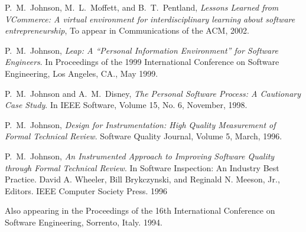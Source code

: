 \begin{Publications: Other Significant}

\item P.~M.~Johnson, M.~L.~Moffett, and B.~T.~Pentland, {\em Lessons
Learned from VCommerce: A virtual environment for interdisciplinary
learning about software entrepreneurship}, To appear in Communications of
the ACM, 2002.

\item P.~M.~Johnson, {\em Leap: A ``Personal Information Environment'' for
Software Engineers}. In
  Proceedings of the 1999 International Conference on Software Engineering,
  Los Angeles, CA., May 1999.
  
  
\item P.~M.~Johnson and A.~M.~Disney, {\em The Personal Software Process: A
    Cautionary Case Study}.  In IEEE Software, Volume 15, No. 6, November,
  1998.

\item P.~M.~Johnson, {\em Design for Instrumentation: High Quality
    Measurement of Formal Technical Review}.  Software Quality Journal,
  Volume 5, March, 1996.

\item P.~M.~Johnson, {\em An Instrumented Approach to Improving Software
  Quality through Formal Technical Review}. In Software Inspection: 
  An Industry Best Practice.  David A. Wheeler, Bill Brykczynski, and
  Reginald N. Meeson, Jr., Editors.  IEEE Computer Society Press. 1996

  Also appearing in the Proceedings of the 16th International Conference on
  Software Engineering, Sorrento,  Italy. 1994.


\end{Publications: Other Significant}


